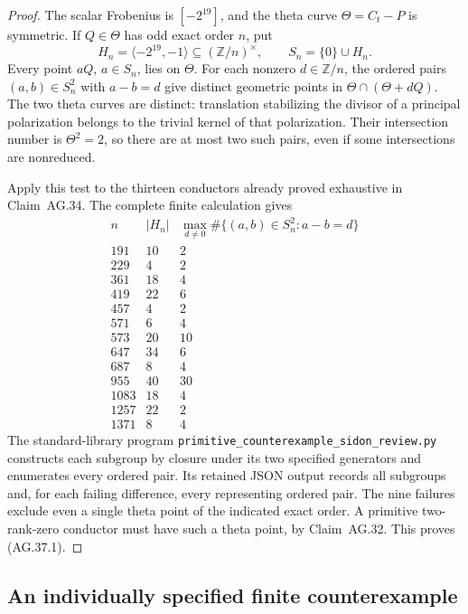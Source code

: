 \begin{proof}
The scalar Frobenius is \([-2^{19}]\), and the theta curve
\(\Theta=C_t-P\) is symmetric. If \(Q\in\Theta\) has odd
exact order \(n\), put
\[
 H_n=\langle-2^{19},-1\rangle\subseteq(\mathbb Z/n)^\times,
 \qquad S_n=\{0\}\cup H_n.
\]
Every point \(aQ\), \(a\in S_n\), lies on \(\Theta\).
For each nonzero \(d\in\mathbb Z/n\), the ordered pairs
\((a,b)\in S_n^2\) with \(a-b=d\) give distinct geometric
points in \(\Theta\cap(\Theta+dQ)\). The two theta curves
are distinct: translation stabilizing the divisor of a principal
polarization belongs to the trivial kernel of that polarization.
Their intersection number is \(\Theta^2=2\), so there are at
most two such pairs, even if some intersections are nonreduced.

Apply this test to the thirteen conductors already proved exhaustive
in Claim~AG.34. The complete finite calculation gives
\[
\begin{array}{r|r|r}
 n&|H_n|&\max_{d\ne0}\#\{(a,b)\in S_n^2:a-b=d\}\\\hline
 191&10&2\\229&4&2\\361&18&4\\419&22&6\\457&4&2\\
 571&6&4\\573&20&10\\647&34&6\\687&8&4\\955&40&30\\
 1083&18&4\\1257&22&2\\1371&8&4
\end{array}
\]
The standard-library program
\texttt{primitive\_counterexample\_sidon\_review.py}
constructs each subgroup by closure under its two specified generators
and enumerates every ordered pair. Its retained JSON output records
all subgroups and, for each failing difference, every representing
ordered pair. The nine failures exclude even a single theta point of
the indicated exact order. A primitive two-rank-zero conductor must
have such a theta point, by Claim~AG.32. This proves (AG.37.1).
\end{proof}


\subsection{An individually specified finite counterexample}

